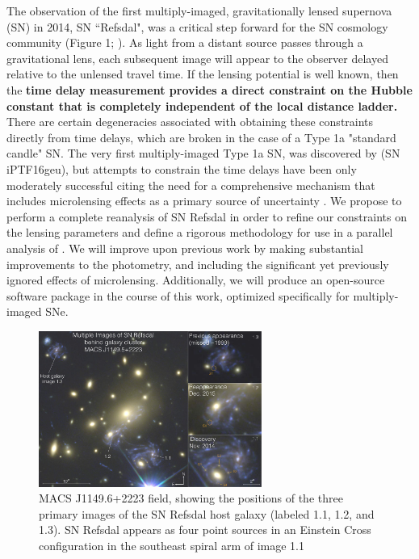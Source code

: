 \forceindent The observation of the first multiply-imaged, gravitationally lensed supernova (SN) in 2014, SN ``Refsdal", 
was a critical step forward for the SN cosmology community (Figure 1; \citet{Kelly:2015a}). As light from a distant
source passes through a gravitational lens, each subsequent image will appear to the observer delayed relative to the 
unlensed travel time. If the lensing potential is well known, then the {\bf time delay measurement  provides a direct constraint on
the Hubble constant that is completely independent of the local distance ladder.} There are certain degeneracies associated with
obtaining these constraints directly from time delays, which are broken in the case of a Type 1a "standard candle" SN. The very 
first multiply-imaged Type 1a SN, was discovered by \citet{Goobar:2016} (SN iPTF16geu), but attempts to constrain the time delays have been 
only moderately successful citing the need for a comprehensive mechanism that includes microlensing effects as a primary source of uncertainty 
\citep{More:2016}. We propose to perform a complete reanalysis of SN Refsdal in order to refine our constraints on the lensing parameters 
and define a rigorous methodology for use in a parallel analysis of . We will improve upon previous work by making substantial improvements 
to the photometry, and including the significant yet previously ignored effects of microlensing. Additionally, we will produce an open-source software 
package in the course of this work, optimized specifically for multiply-imaged SNe. 

\begin{figure}[h]
\centering
\includegraphics[width=0.65\textwidth]{FIG/refsdal_rodney.pdf}
\caption{
MACS J1149.6+2223 field, showing the positions of the three primary
images of the SN Refsdal host galaxy (labeled 1.1, 1.2, and 1.3). SN
Refsdal appears as four point sources in an Einstein Cross
configuration in the southeast spiral arm of image 1.1 \citep{Rodney:2016}}
\end{figure}


